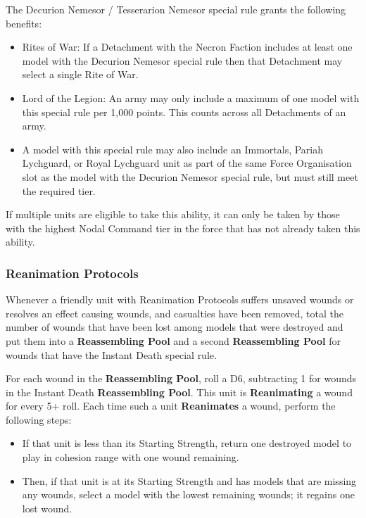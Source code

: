 \begin{multicols}{2}
The Decurion Nemesor / Tesserarion Nemesor special rule grants the following benefits:

\begin{itemize}
	\itemsep 0pt
	\item Rites of War: If a Detachment with the Necron Faction includes at least one model with the Decurion Nemesor special rule then that Detachment may select a single Rite of War. 
	\item Lord of the Legion: An army may only include a maximum of one model with this special rule per 1,000 points. This counts across all Detachments of an army.
	\item A model with this special rule may also include an Immortals, Pariah Lychguard, or Royal Lychguard unit as part of the same Force Organisation slot as the model with the Decurion Nemesor special rule, but must still meet the required  tier.
\end{itemize}

If multiple units are eligible to take this ability, it can only be taken by those with the highest Nodal Command tier in the force that has not already taken this ability. 

\subsubsection{Reanimation Protocols} \label{Reanimation Protocols}

Whenever a friendly unit with Reanimation Protocols suffers unsaved wounds or resolves an effect causing wounds, and casualties have been removed, total the number of wounds that have been lost among models that were destroyed and put them into a \textbf{Reassembling Pool} and a second \textbf{Reassembling Pool} for wounds that have the Instant Death special rule.

For each wound in the \textbf{Reassembling Pool}, roll a D6, subtracting 1 for wounds in the Instant Death \textbf{Reassembling Pool}. This unit is \textbf{Reanimating} a wound for every 5+ roll. Each time such a unit \textbf{Reanimates} a wound, perform the following steps:

\begin{itemize}
	\itemsep 0pt
	\item If that unit is less than its Starting Strength, return one destroyed model to play in cohesion range with one wound remaining.
	\item Then, if that unit is at its Starting Strength and has models that are missing any wounds, select a model with the lowest remaining wounds; it regains one lost wound.
\end{itemize}


\end{multicols}
